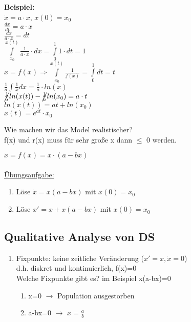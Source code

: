 \textbf{Beispiel:}\\
$\dot{x}=a \cdot x$, $x(0)=x_0$\\
$\displaystyle \frac{dx}{dt}=a \cdot x$\\
$\displaystyle \frac{dx}{a \cdot x} = dt$\\
$\int \limits_{x_0}^{x(t)} \frac{1}{a \cdot x} \cdot dx = \int \limits_{0}^{1} 1 \cdot dt = 1$\\
$\dot{x} = f(x) \Rightarrow \int \limits_{x_0}^{x(t)} \frac{1}{f(x)} = \int \limits_{0}^{1} dt = t$\\
$\frac{1}{a} \int \frac{1}{x} dx = \frac{1}{a} \cdot ln(x)$\\
$\cancel{\frac{1}{a}} ln(x(t)) - \cancel{\frac{1}{a}} ln(x_0)=a \cdot t$\\
$ln(x(t))= a t + ln(x_0)$\\
$x(t)=e^{at} \cdot x_0$

Wie machen wir das Model realistischer?\\
f(x) und r(x) muss für sehr große x dann $\leq$ 0 werden.


$\dot{x}=f(x)=x \cdot (a-bx)$\\
\\
\underline{Übungsaufgabe:}
\begin{enumerate}
	\item Löse $\dot{x}=x(a-bx)$ mit $x(0)=x_0$
	\item Löse $x'=x+x(a-bx)$ mit $x(0)=x_0$
\end{enumerate}

\subsection{Qualitative Analyse von DS}
\begin{enumerate}
	\item Fixpunkte: keine zeitliche Veränderung ($x'=x, \dot{x}=0$)\\
	d.h. diskret und kontinuierlich, f(x)=0\\
	Welche Fixpunkte gibt es? im Beispiel x(a-bx)=0\\
	\begin{enumerate}
		\item x=0 $\rightarrow$ Population ausgestorben
		\item a-bx=0 $\rightarrow$ $x=\frac{a}{b}$\\
	\end{enumerate}
\end{enumerate}

